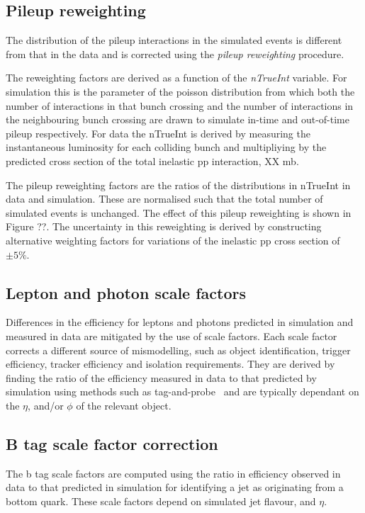\subsection{Pileup reweighting}
The distribution of the pileup interactions in the simulated events is different from
that in the data and is corrected using the \emph{pileup reweighting} procedure. 

The reweighting factors are derived as a function of the \emph{nTrueInt} variable. 
For simulation this is the parameter of the poisson distribution from which 
both the number of interactions in that bunch crossing and the number of interactions in
the neighbouring bunch crossing are drawn to simulate in-time and out-of-time pileup
respectively. For data the nTrueInt is derived by measuring the instantaneous luminosity
for each colliding bunch and multipliying by the predicted cross section 
of the total inelastic pp interaction, XX mb. 

The pileup reweighting factors are the ratios of the distributions in nTrueInt in data
and simulation. These are normalised such that the total number of simulated events 
is unchanged. The effect of this pileup reweighting is shown in Figure ??. The uncertainty
in this reweighting is derived by constructing alternative weighting factors for variations 
of the inelastic pp cross section of $\pm5\%$.

\subsection{Lepton and photon scale factors}
\label{sec:scale-factor}
Differences in the efficiency for leptons and photons predicted in 
simulation and measured in data are mitigated by the use of scale factors. 
Each scale factor corrects a different source of mismodelling, such as 
object identification, trigger efficiency, tracker efficiency and isolation requirements.
They are derived by finding the ratio of the efficiency measured in data to that
predicted by simulation using methods such as tag-and-probe~\cite{MuonReco} and are typically dependant on 
the $\eta$, \pt and/or $\phi$ of the relevant object.

\subsection{B tag scale factor correction}

The b tag scale factors are computed using the ratio in efficiency observed in data
to that predicted in simulation for identifying a jet as originating from a bottom
quark. These scale factors depend on simulated jet flavour, \pt and $\eta$. 

